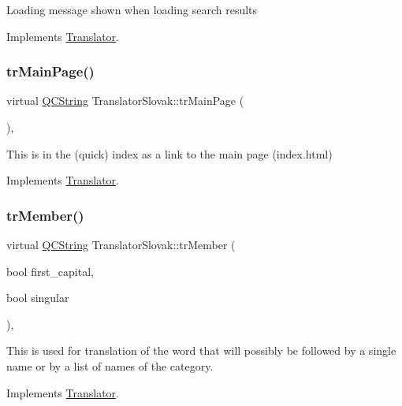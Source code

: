 Loading message shown when loading search results 

Implements \mbox{\hyperlink{class_translator}{Translator}}.

\mbox{\label{class_translator_slovak_ab9885f912111a94e1246b4c4b4f53542}} 
\subsubsection{\texorpdfstring{trMainPage()}{trMainPage()}}
{\footnotesize\ttfamily virtual \mbox{\hyperlink{class_q_c_string}{Q\+C\+String}} Translator\+Slovak\+::tr\+Main\+Page (\begin{DoxyParamCaption}{ }\end{DoxyParamCaption})\hspace{0.3cm}{\ttfamily [inline]}, {\ttfamily [virtual]}}

This is in the (quick) index as a link to the main page (index.\+html) 

Implements \mbox{\hyperlink{class_translator}{Translator}}.

\mbox{\label{class_translator_slovak_a39b140843a58197b63ea4b7efc6793a0}} 
\subsubsection{\texorpdfstring{trMember()}{trMember()}}
{\footnotesize\ttfamily virtual \mbox{\hyperlink{class_q_c_string}{Q\+C\+String}} Translator\+Slovak\+::tr\+Member (\begin{DoxyParamCaption}\item[{bool}]{first\+\_\+capital,  }\item[{bool}]{singular }\end{DoxyParamCaption})\hspace{0.3cm}{\ttfamily [inline]}, {\ttfamily [virtual]}}

This is used for translation of the word that will possibly be followed by a single name or by a list of names of the category. 

Implements \mbox{\hyperlink{class_translator}{Translator}}.

\mbox{\label{class_translator_slovak_a7023168878df92e5fbec32ee07c07e39}} 
